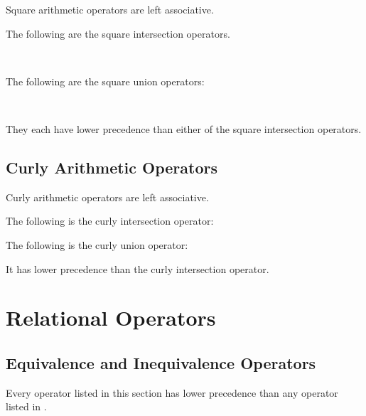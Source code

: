 Square arithmetic operators are left associative.

The following are the square intersection operators.
\begin{tabbing}
\UnicodeKillLine
{} \\
\end{tabbing}

The following are the square union operators:
\begin{tabbing}
\UnicodeKillLine
{} \\
\end{tabbing}
They each have lower precedence than either of the square intersection operators.


\subsection{Curly Arithmetic Operators}

Curly arithmetic operators are left associative.

The following is the curly intersection operator:
\begin{tabbing}
\UnicodeKillLine
{}
\end{tabbing}

The following is the curly union operator:
\begin{tabbing}
\UnicodeKillLine
{}
\end{tabbing}
It has lower precedence than the curly intersection operator.

\section{Relational Operators}

\subsection{Equivalence and Inequivalence Operators}

Every operator listed in this section
has lower precedence than any operator listed in
.

